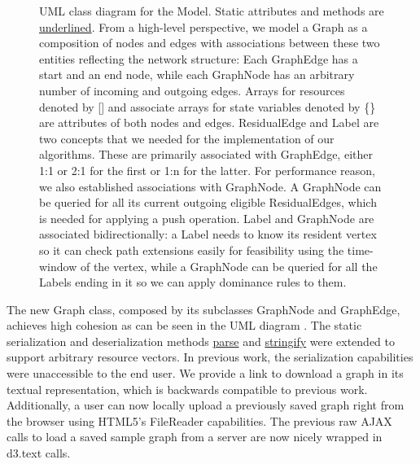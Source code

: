 \begin{figure}[htb!]
\caption{UML class diagram for the Model. Static attributes and methods are \underline{underlined}. From a high-level perspective, we model a Graph as a composition of nodes and edges with associations between these two entities reflecting the network structure: Each GraphEdge has a start and an end node, while each GraphNode has an arbitrary number of incoming and outgoing edges. Arrays for resources denoted by [] and associate arrays for state variables denoted by \{\} are attributes of both nodes and edges. ResidualEdge and Label are two concepts that we needed for the implementation of our algorithms. These are primarily associated with GraphEdge, either 1:1 or 2:1 for the first or 1:n for the latter. For performance reason, we also established associations with GraphNode. A GraphNode can be queried for all its current outgoing eligible ResidualEdges, which is needed for applying a push operation. Label and GraphNode are associated bidirectionally: a Label needs to know its resident vertex so it can check path extensions easily for feasibility using the time-window of the vertex, while a GraphNode can be queried for all the Labels ending in it so we can apply dominance rules to them.}
\label{fig:model}
\end{figure}

The new Graph class, composed by its subclasses GraphNode and GraphEdge, achieves high cohesion as can be seen in the UML diagram . The static serialization and deserialization methods \underline{parse} and \underline{stringify} were extended to support arbitrary resource vectors. In previous work, the serialization capabilities were unaccessible to the end user. We provide a link to download a graph in its textual representation, which is backwards compatible to previous work. Additionally, a user can now locally upload a previously saved graph right from the browser using HTML5's FileReader  capabilities. The previous raw AJAX  calls to load a saved sample graph from a server are now nicely wrapped in d3.text calls.

